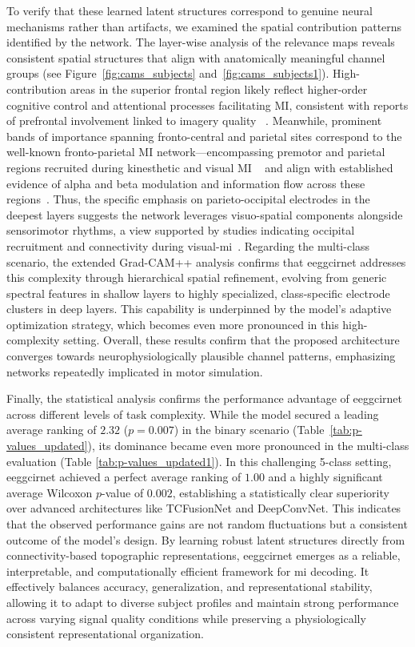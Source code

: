 {{To verify that these learned latent structures correspond to genuine neural mechanisms rather than artifacts, we examined the spatial contribution patterns identified by the network. The layer-wise analysis of the relevance maps reveals consistent spatial structures that align with anatomically meaningful channel groups (see Figure~\ref{fig:cams_subjects} and~\ref{fig:cams_subjects1}). High-contribution areas in the superior frontal region likely reflect higher-order cognitive control and attentional processes facilitating MI, consistent with reports of prefrontal involvement linked to imagery quality ~\cite{hetu2013neural,delange2008cortex,kurkin2023tmsdlpfc}. Meanwhile, prominent bands of importance spanning fronto-central and parietal sites correspond to the well-known fronto-parietal MI network—encompassing premotor and parietal regions recruited during kinesthetic and visual MI ~\cite{mustile2024walking} and align with established evidence of alpha and beta modulation and information flow across these regions~\cite{zhou2025vmi}. Thus, the specific emphasis on parieto-occipital electrodes in the deepest layers suggests the network leverages visuo-spatial components alongside sensorimotor rhythms, a view supported by studies indicating occipital recruitment and connectivity during visual-\gls{mi}~\cite{dijkstra2024evc}. Regarding the multi-class scenario, the extended Grad-CAM++ analysis confirms that \gls{eeggcirnet} addresses this complexity through hierarchical spatial refinement, evolving from generic spectral features in shallow layers to highly specialized, class-specific electrode clusters in deep layers. This capability is underpinned by the model's adaptive optimization strategy, which becomes even more pronounced in this high-complexity setting. Overall, these results confirm that the proposed architecture converges towards neurophysiologically plausible channel patterns, emphasizing networks repeatedly implicated in motor simulation.

Finally, the statistical analysis confirms the performance advantage of \gls{eeggcirnet} across different levels of task complexity. While the model secured a leading average ranking of $2.32$ ($p=0.007$) in the binary scenario (Table~\ref{tab:p-values_updated}), its dominance became even more pronounced in the multi-class evaluation (Table \ref{tab:p-values_updated1}). In this challenging 5-class setting, \gls{eeggcirnet} achieved a perfect average ranking of ${1.00}$ and a highly significant average Wilcoxon $p$-value of ${0.002}$, establishing a statistically clear superiority over advanced architectures like TCFusionNet and DeepConvNet. This indicates that the observed performance gains are not random fluctuations but a consistent outcome of the model’s design. By learning robust latent structures directly from connectivity-based topographic representations, \gls{eeggcirnet} emerges as a reliable, interpretable, and computationally efficient framework for \gls{mi} decoding. It effectively balances accuracy, generalization, and representational stability, allowing it to adapt to diverse subject profiles and maintain strong performance across varying signal quality conditions while preserving a physiologically consistent representational organization.

}}
